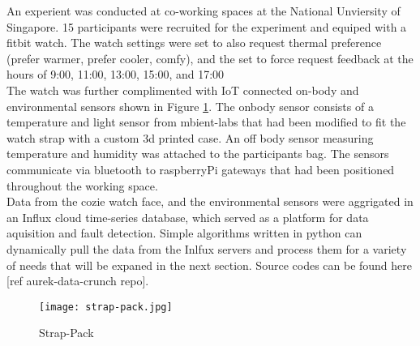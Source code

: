 
An experient was conducted at co-working spaces at the National Unviersity of Singapore. 15 participants were recruited for the experiment and equiped with a fitbit watch. The watch settings were set to also request thermal preference (prefer warmer, prefer cooler, comfy), and the set to force request feedback at the hours of 9:00, 11:00, 13:00, 15:00, and 17:00 \\

The watch was further complimented with IoT connected on-body and environmental sensors shown in Figure \ref{fig:strappack}. The onbody sensor consists of a temperature and light sensor from mbient-labs that had been modified to fit the watch strap with a custom 3d printed case. An off body sensor measuring temperature and humidity was attached to the participants bag. The sensors communicate via bluetooth to raspberryPi gateways that had been positioned throughout the working space. \\

Data from the cozie watch face, and the environmental sensors were aggrigated in an Influx cloud time-series database, which served as a platform for data aquisition and fault detection. Simple algorithms written in python can dynamically pull the data from the Inlfux servers and process them for a variety of needs that will be expaned in the next section. Source codes can be found here [ref aurek-data-crunch repo].


\begin{figure}
\begin{center}
\texttt{[image: strap-pack.jpg]}
\caption{Strap-Pack}
\label{fig:strappack}
\end{center}
\end{figure}

